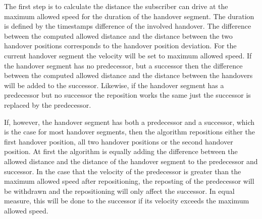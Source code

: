 \documentclass[twocolumn]{bmcart}%
\makeatletter
\newcommand{\removelatexerror}{\let\@latex@error\@gobble}
\makeatother
\begin{document}
The first step is to calculate the distance the subscriber can drive at the maximum allowed speed for the duration of the handover segment. The duration is defined by the timestamps difference of the involved handover. The difference between the computed allowed distance and the distance between the two handover positions corresponds to the handover position deviation. For the current handover segment the velocity will be set to maximum allowed speed. If the handover segment has no predecessor, but a successor then the difference between the computed allowed distance and the distance between the handovers will be added to the successor. Likewise, if the handover segment has a predecessor but no successor the reposition works the same just the successor is replaced by the predecessor. 

If, however, the handover segment has both a predecessor and a successor, which is the case for most handover segments, then the algorithm repositions either the first handover position, all two handover positions or the second handover position. At first the algorithm is equally adding the difference between the allowed distance and the distance of the handover segment to the predecessor and successor. In the case that the velocity of the predecessor is greater than the maximum allowed speed after repositioning, the reposting of the predecessor will be withdrawn and the repositioning will only affect the successor. In equal measure, this will be done to the successor if its velocity exceeds the maximum allowed speed. 

  

%      	      	      	      
\end{document}
